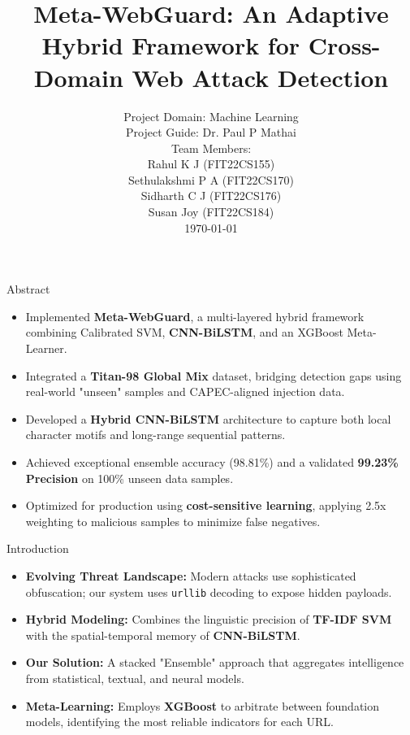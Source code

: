 \documentclass[aspectratio=169,xcolor=dvipsnames]{beamer}
\title{Meta-WebGuard: An Adaptive Hybrid Framework for Cross-Domain
Web Attack Detection}
\author{\small Project Domain: Machine Learning\\
Project Guide: Dr. Paul P Mathai\\
Team Members: \\
Rahul K J (FIT22CS155)\\
Sethulakshmi P A (FIT22CS170)\\
Sidharth C J (FIT22CS176)\\
Susan Joy (FIT22CS184)\\[0.5cm]
\today
}
\begin{document}
\begin{frame}
    \titlepage
\end{frame}

\begin{frame}{Abstract}
\begin{itemize}
    \item Implemented \textbf{Meta-WebGuard}, a multi-layered hybrid framework combining Calibrated SVM, \textbf{CNN-BiLSTM}, and an XGBoost Meta-Learner.
    \item Integrated a \textbf{Titan-98 Global Mix} dataset, bridging detection gaps using real-world "unseen" samples and CAPEC-aligned injection data.
    \item Developed a \textbf{Hybrid CNN-BiLSTM} architecture to capture both local character motifs and long-range sequential patterns.
    \item Achieved exceptional ensemble accuracy (98.81\%) and a validated \textbf{99.23\% Precision} on 100\% unseen data samples.
    \item Optimized for production using \textbf{cost-sensitive learning}, applying 2.5x weighting to malicious samples to minimize false negatives.
\end{itemize}
\end{frame}

\begin{frame}{Introduction}
\begin{itemize}
    \item \textbf{Evolving Threat Landscape:} Modern attacks use sophisticated obfuscation; our system uses \texttt{urllib} decoding to expose hidden payloads.
    \item \textbf{Hybrid Modeling:} Combines the linguistic precision of \textbf{TF-IDF SVM} with the spatial-temporal memory of \textbf{CNN-BiLSTM}.
    \item \textbf{Our Solution:} A stacked "Ensemble" approach that aggregates intelligence from statistical, textual, and neural models.
    \item \textbf{Meta-Learning:} Employs \textbf{XGBoost} to arbitrate between foundation models, identifying the most reliable indicators for each URL.
\end{itemize}
\end{frame}
\end{document}
